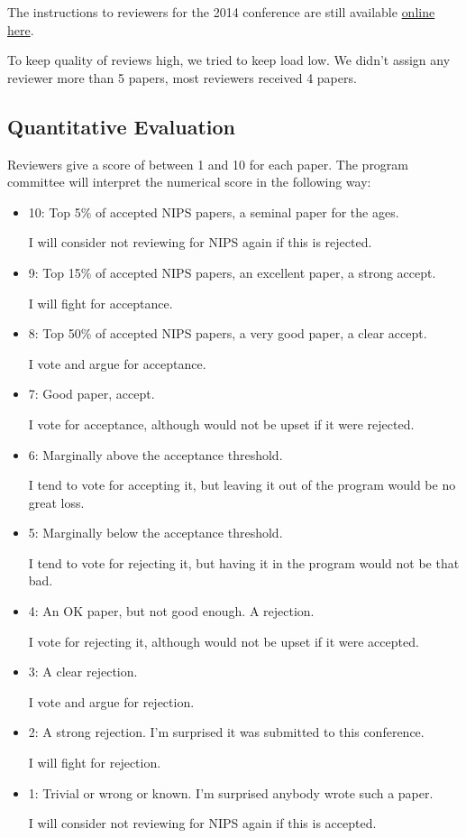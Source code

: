 The instructions to reviewers for the 2014 conference are still
available
\href{https://nips.cc/Conferences/2014/PaperInformation/ReviewerInstructions}{online
here}.

To keep quality of reviews high, we tried to keep load low. We didn't
assign any reviewer more than 5 papers, most reviewers received 4
papers.

\hypertarget{quantitative-evaluation}{%
\subsection{Quantitative Evaluation}\label{quantitative-evaluation}}

Reviewers give a score of between 1 and 10 for each paper. The program
committee will interpret the numerical score in the following way:

\begin{itemize}
\item
  10: Top 5\% of accepted NIPS papers, a seminal paper for the ages.

  I will consider not reviewing for NIPS again if this is rejected.
\item
  9: Top 15\% of accepted NIPS papers, an excellent paper, a strong
  accept.

  I will fight for acceptance.
\item
  8: Top 50\% of accepted NIPS papers, a very good paper, a clear
  accept.

  I vote and argue for acceptance.
\item
  7: Good paper, accept.

  I vote for acceptance, although would not be upset if it were
  rejected.
\item
  6: Marginally above the acceptance threshold.

  I tend to vote for accepting it, but leaving it out of the program
  would be no great loss.
\item
  5: Marginally below the acceptance threshold.

  I tend to vote for rejecting it, but having it in the program would
  not be that bad.
\item
  4: An OK paper, but not good enough. A rejection.

  I vote for rejecting it, although would not be upset if it were
  accepted.
\item
  3: A clear rejection.

  I vote and argue for rejection.
\item
  2: A strong rejection. I'm surprised it was submitted to this
  conference.

  I will fight for rejection.
\item
  1: Trivial or wrong or known. I'm surprised anybody wrote such a
  paper.

  I will consider not reviewing for NIPS again if this is accepted.
\end{itemize}

